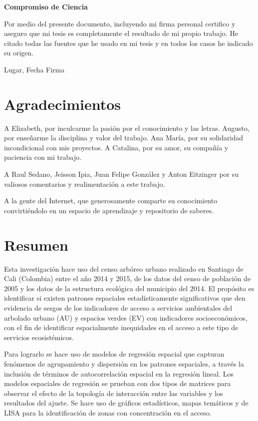 \documentclass[12pt,a4paper,oneside, openany]{book}
\title{}
\author{}
\date{}
\theoremstyle{definition}
\theoremstyle{definition}
\theoremstyle{definition}
\theoremstyle{remark}
\begin{document}
% 


\textbf{Compromiso de Ciencia}

Por medio del presente documento, incluyendo mi firma personal certifico
y aseguro que mi tesis es completamente el resultado de mi propio
trabajo. He citado todas las fuentes que he usado en mi tesis y en todos
los casos he indicado su origen.

\bigskip
\hrulefill 

Lugar, Fecha \hfill Firma

\chapter*{Agradecimientos}\label{agradecimientos}

A Elizabeth, por inculcarme la pasión por el conocimiento y las letras.
Augusto, por enseñarme la disciplina y valor del trabajo. Ana María, por
su solidaridad incondicional con mis proyectos. A Catalina, por su amor,
su compañía y paciencia con mi trabajo.

A Raul Sedano, Jeisson Ipia, Juan Felipe González y Anton Eitzinger por
su valiosos comentarios y realimentación a este trabajo.

A la gente del Internet, que generosamente comparte su conocimiento
convirtiéndolo en un espacio de aprendizaje y repositorio de saberes.


\chapter*{Resumen}\label{resumen}


Esta investigación hace uso del censo arbóreo urbano realizado en
Santiago de Cali (Colombia) entre el año 2014 y 2015, de los datos del
censo de población de 2005 y los datos de la estructura ecológica del
municipio del 2014. El propósito es identificar si existen patrones
espaciales estadísticamente significativos que den evidencia de sesgos
de los indicadores de acceso a servicios ambientales del arbolado urbano
(AU) y espacios verdes (EV) con indicadores socioeconómicos, con el fin
de identificar espacialmente inequidades en el acceso a este tipo de
servicios ecosistémicos.

Para lograrlo se hace uso de modelos de regresión espacial que capturan
fenómenos de agrupamiento y dispersión en los patrones espaciales, a
través la inclusión de términos de autocorrelación espacial en la
regresión lineal. Los modelos espaciales de regresión se prueban con dos
tipos de matrices para observar el efecto de la topología de interacción
entre las variables y los resultados del ajuste. Se hace uso de gráficos
estadísticos, mapas temáticos y de LISA para la identificación de zonas
con concentración en el acceso.
\end{document}
